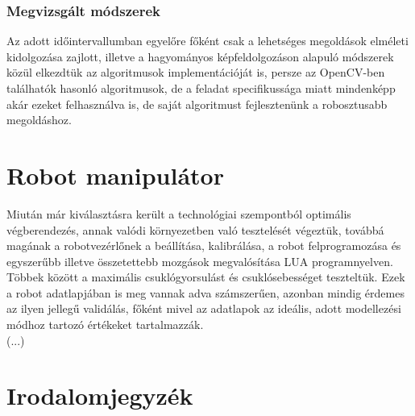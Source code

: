 \documentclass{article}
\begin{document}
\subsubsection{Megvizsgált módszerek}
Az adott időintervallumban egyelőre főként csak a lehetséges megoldások elméleti kidolgozása zajlott, illetve
a hagyományos képfeldolgozáson alapuló módszerek közül elkezdtük az algoritmusok implementációját is, persze
az OpenCV-ben találhatók hasonló algoritmusok, de a feladat specifikussága miatt mindenképp akár ezeket felhasználva is, 
de saját algoritmust fejlesztenünk a robosztusabb megoldáshoz.
\section{Robot manipulátor}
Miután már kiválasztásra került a technológiai szempontból optimális végberendezés, annak valódi környezetben 
való tesztelését végeztük, továbbá magának a robotvezérlőnek a beállítása, kalibrálása, a robot felprogramozása és 
egyszerűbb illetve összetettebb mozgások megvalósítása LUA programnyelven.\\[5pt]
Többek között a maximális csuklógyorsulást és csuklósebességet teszteltük. Ezek a robot adatlapjában is meg vannak adva 
számszerűen, azonban mindig érdemes az ilyen jellegű validálás, főként mivel az adatlapok az ideális, adott modellezési 
módhoz tartozó értékeket tartalmazzák.\\
(...)

\section{Irodalomjegyzék}
\end{document}
